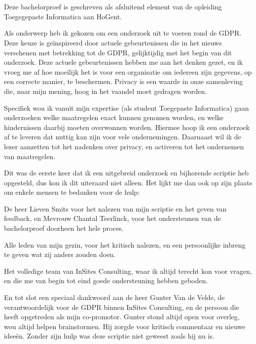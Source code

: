 
\chapter*{}
\label{ch:voorwoord}

Deze bachelorproef is geschreven als afsluitend element van de opleiding Toegegepaste Informatica aan HoGent. 

Als onderwerp heb ik gekozen om een onderzoek uit te voeren rond de GDPR. Deze keuze is geïnspireerd door actuele gebeurtenissen
die in het nieuws verschenen met betrekking tot de GDPR, gelijktijdig met het begin van dit onderzoek. Deze actuele gebeurtenissen hebben me aan het denken gezet, en ik vroeg me af hoe moeilijk het is voor een organisatie om iedereen zijn gegevens, op een correcte manier, te beschermen. Privacy is een waarde in onze samenleving die, naar mijn mening, hoog in het vaandel moet gedragen worden. 

Specifiek wou ik vanuit mijn expertise (als student Toegepaste Informatica) gaan onderzoeken welke maatregelen exact kunnen genomen worden, en welke hindernissen daarbij moeten overwonnen worden. 
Hiermee hoop ik een onderzoek af te leveren dat nuttig kan zijn voor vele ondernemingen. Daarnaast wil ik de lezer aanzetten tot het nadenken over privacy, en activeren tot het ondernemen van maatregelen. 
 
Dit was de eerste keer dat ik een uitgebreid onderzoek en bijhorende scriptie heb opgesteld, dus kon ik dit uiteraard niet alleen. Het lijkt me dan ook op zijn plaats om enkele mensen te bedanken voor de hulp:

De heer Lieven Smits voor het nalezen van mijn scriptie en het geven van feedback, en Mevrouw Chantal Teerlinck, voor het ondersteunen van de bachelorproef doorheen het hele proces. 

Alle leden van mijn gezin, voor het kritisch nalezen, en een persoonlijke inbreng te geven wat zij anders zouden doen. 

Het volledige team van InSites Consulting, waar ik altijd terecht kon voor vragen, en die me van begin tot eind goede ondersteuning hebben geboden. 

En tot slot een speciaal dankwoord aan de heer Gunter Van de Velde, de verantwoordelijk voor de GDPR binnen InSites Consulting, en de persoon die heeft opgetreden als mijn co-promotor. Gunter stond altijd open voor overleg, wou altijd helpen brainstormen. Hij zorgde voor kritisch commentaar en nieuwe ideeën. Zonder zijn hulp was deze scriptie niet geweest zoals hij nu is. 



